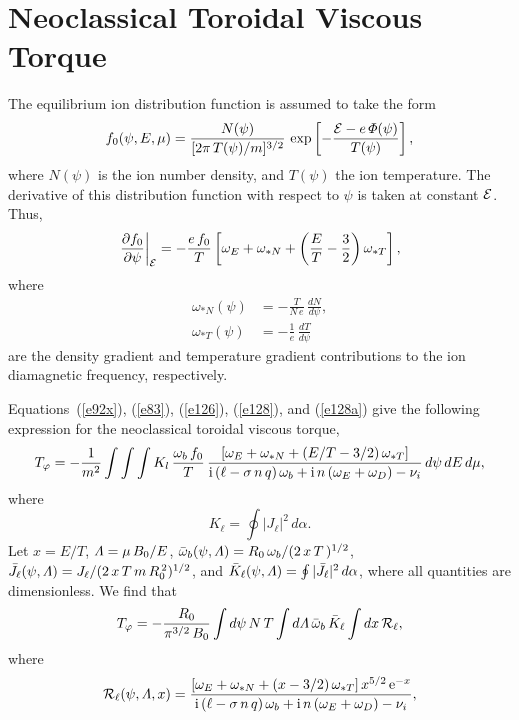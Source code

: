 \documentclass[12pt,prb,aps,notitlepage]{revtex4-1}
\begin{document}
\section{Neoclassical Toroidal Viscous Torque}
The equilibrium ion distribution function is assumed to take the form 
\begin{equation}
f_0(\psi,E,\mu) = \frac{N(\psi)}{[2\pi\,T(\psi)/m]^{3/2}}\,\exp\left[-\frac{{\cal E}-e\,{\mit\Phi}(\psi)}{T(\psi)}\right],
\end{equation} 
where $N(\psi)$ is the ion number density, and $T(\psi)$ the ion temperature. The derivative of this distribution function with respect to $\psi$ is
taken at constant ${\cal E}$. Thus, 
\begin{equation}\label{e128a}
\left.\frac{\partial f_0}{\partial\psi}\right|_{\cal E}= -\frac{e\,f_0}{T}\left[\omega_E +\omega_{\ast N}+ \left(\frac{E}{T}-\frac{3}{2}\right)\omega_{\ast T}\right],
\end{equation}
where
\begin{align}
\omega_{\ast N}(\psi)&= - \frac{T}{N\,e}\,\frac{dN}{d\psi},\\[0.5ex]
\omega_{\ast T}(\psi)&=-\frac{1}{e}\,\frac{dT}{d\psi}
\end{align}
are the density gradient and temperature gradient contributions to the ion diamagnetic frequency, respectively. 

Equations~(\ref{e92x}), (\ref{e83}), (\ref{e126}), (\ref{e128}), and (\ref{e128a}) give the following expression for the neoclassical toroidal viscous torque,
\begin{equation}
T_\varphi =- \frac{1}{m^2}\int\int\int K_l\,\frac{\omega_b\,f_0}{T}\,\frac{[\omega_E + \omega_{\ast N}+(E/T-3/2)\,\omega_{\ast T}]}{
{\rm i}\,(\ell - \sigma\,n\,q)\,\omega_b +{\rm i}\,n\,(\omega_E+\omega_D)-\nu_i}\,d\psi\,dE\,d\mu,
\end{equation}
where
\begin{equation}
K_\ell = \oint| J_\ell|^2\,d\alpha.
\end{equation}
Let $x=E/T$, ${\mit\Lambda}=\mu\,B_0/E$, $\bar{\omega}_b(\psi,{\mit\Lambda}) = R_0\,\omega_b/(2\,x\,T\,)^{1/2}$, $\bar{J}_\ell(\psi,{\mit\Lambda}) = J_\ell/(2\,x\,T\,m\,R_0^{\,2})^{1/2}$,
and $\bar{K}_\ell(\psi, {\mit\Lambda}) = \oint |\bar{J}_\ell|^2\,d\alpha$, where all quantities are dimensionless. We find that
\begin{equation}
T_\varphi = - \frac{R_0}{\pi^{3/2}\,B_0}\int d\psi\,N\,T\int d{\mit\Lambda}\,\bar{\omega}_b\,\bar{K}_\ell\int dx\,{\cal R}_\ell,
\end{equation}
where
\begin{equation}
{\cal R}_\ell(\psi,{\mit\Lambda},x) =\frac{[\omega_E + \omega_{\ast N}+(x-3/2)\,\omega_{\ast T}]\,x^{5/2}\,{\rm e}^{-x}}{
{\rm i}\,(\ell - \sigma\,n\,q)\,\omega_b +{\rm i}\,n\,(\omega_E+\omega_D)-\nu_i},
\end{equation}
  
\end{document}
